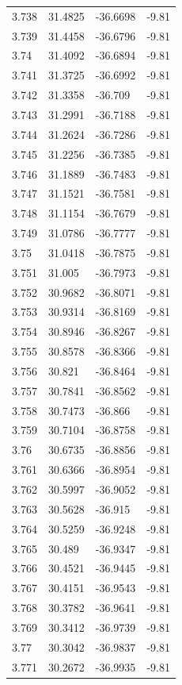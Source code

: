 \begin{tabular}{llll}
3.738 & 31.4825 & -36.6698 & -9.81 \\
3.739 & 31.4458 & -36.6796 & -9.81 \\
3.74 & 31.4092 & -36.6894 & -9.81 \\
3.741 & 31.3725 & -36.6992 & -9.81 \\
3.742 & 31.3358 & -36.709 & -9.81 \\
3.743 & 31.2991 & -36.7188 & -9.81 \\
3.744 & 31.2624 & -36.7286 & -9.81 \\
3.745 & 31.2256 & -36.7385 & -9.81 \\
3.746 & 31.1889 & -36.7483 & -9.81 \\
3.747 & 31.1521 & -36.7581 & -9.81 \\
3.748 & 31.1154 & -36.7679 & -9.81 \\
3.749 & 31.0786 & -36.7777 & -9.81 \\
3.75 & 31.0418 & -36.7875 & -9.81 \\
3.751 & 31.005 & -36.7973 & -9.81 \\
3.752 & 30.9682 & -36.8071 & -9.81 \\
3.753 & 30.9314 & -36.8169 & -9.81 \\
3.754 & 30.8946 & -36.8267 & -9.81 \\
3.755 & 30.8578 & -36.8366 & -9.81 \\
3.756 & 30.821 & -36.8464 & -9.81 \\
3.757 & 30.7841 & -36.8562 & -9.81 \\
3.758 & 30.7473 & -36.866 & -9.81 \\
3.759 & 30.7104 & -36.8758 & -9.81 \\
3.76 & 30.6735 & -36.8856 & -9.81 \\
3.761 & 30.6366 & -36.8954 & -9.81 \\
3.762 & 30.5997 & -36.9052 & -9.81 \\
3.763 & 30.5628 & -36.915 & -9.81 \\
3.764 & 30.5259 & -36.9248 & -9.81 \\
3.765 & 30.489 & -36.9347 & -9.81 \\
3.766 & 30.4521 & -36.9445 & -9.81 \\
3.767 & 30.4151 & -36.9543 & -9.81 \\
3.768 & 30.3782 & -36.9641 & -9.81 \\
3.769 & 30.3412 & -36.9739 & -9.81 \\
3.77 & 30.3042 & -36.9837 & -9.81 \\
3.771 & 30.2672 & -36.9935 & -9.81 \\

\end{tabular}
